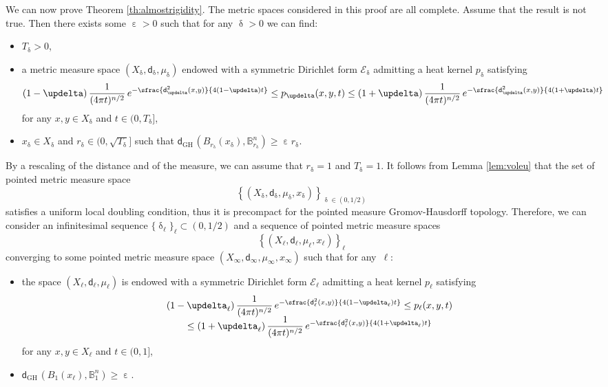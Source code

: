 \documentclass[JEP,XML,SOM,Unicode,published]{cedram}
\newcommand{\sGH}{{\scriptscriptstyle\mathrm{GH}\,}}
\theoremstyle{plain}
\theoremstyle{definition}
\newcommand{\setB}{\mathbb{B}}
\newcommand{\cE}{\mathcal{E}}
\newcommand{\dist}{\mathsf{d}}
\begin{document}
We can now prove Theorem \ref{th:almostrigidity}.
\proof The metric spaces considered in this proof are all complete. Assume that the result is not true. Then there exists some $\upepsilon>0$ such that for any $\updelta>0$ we can find:\begin{itemize}
\item $T_\updelta>0$,
\item a metric measure space $(X_\updelta,\dist_\updelta, \mu_\updelta)$ endowed with a symmetric Dirichlet form $\cE_\updelta$
admitting a heat kernel $p_\updelta$ satisfying
\[
(1-\updelta)\, \frac{1}{(4 \pi t)^{n/2}}\, e^{-\sfrac{\dist_\updelta^2(x,y)}{4(1-\updelta)t}}\le p_\updelta(x,y,t) \le (1+\updelta)\, \frac{1}{(4 \pi t)^{n/2}}\, e^{-\sfrac{\dist_\updelta^2(x,y)}{4(1+\updelta) t}}
\]
for any $x,y \in X_\updelta$ and $t\in (0,T_\updelta]$,
\item $x_\updelta\in X_\updelta$ and $r_\updelta\in (0,\sqrt{T_\updelta}]$ such that $\dist_{\sGH}\left(B_{r_\updelta}(x_\updelta), \setB^n_{r_\updelta}\right) \ge \upepsilon r_\updelta$.
\end{itemize}
By a rescaling of the distance and of the measure, we can assume that $r_\updelta=1$ and $T_\updelta=1$.
It follows from Lemma \ref{lem:voleu} that the set of pointed metric measure space
\[
\left\{(X_\updelta,\dist_\updelta,\mu_\updelta,x_\updelta)\right\}_{\updelta\in (0,1/2)}
\]
satisfies a uniform local doubling condition, thus it is precompact for the pointed measure Gromov-Hausdorff topology. Therefore, we can consider an infinitesimal sequence $\{\updelta_\ell\}_\ell \subset (0,1/2)$ and a sequence of pointed metric measure spaces
\[
\left\{(X_\ell,\dist_\ell,\mu_\ell,x_\ell)\right\}_{\ell}
\]
converging to some pointed metric measure space $(X_\infty,\dist_\infty,\mu_\infty,x_\infty)$ such that for any~$\ell$:
\begin{itemize}
\item the space $(X_\ell,\dist_\ell,\mu_\ell)$ is endowed with a symmetric Dirichlet form $\cE_\ell$
admitting a heat kernel $p_\ell$ satisfying
\begin{multline}\label{eq:14.17}
(1-\updelta_\ell)\, \frac{1}{(4 \pi t)^{n/2}}\, e^{-\sfrac{\dist_\ell^2(x,y)}{4(1-\updelta_\ell)t}}\le p_\ell(x,y,t)\\[-5pt]
\le (1+\updelta_\ell)\, \frac{1}{(4 \pi t)^{n/2}}\, e^{-\sfrac{\dist_\ell^2(x,y)}{4(1+\updelta_\ell)t}}
\end{multline}
for any $x,y \in X_\ell$ and $t\in (0,1]$,
\item $\dist_{\sGH}\left(B_1(x_\ell), \setB^n_1\right) \ge \upepsilon. $
\end{itemize}
\end{document}
